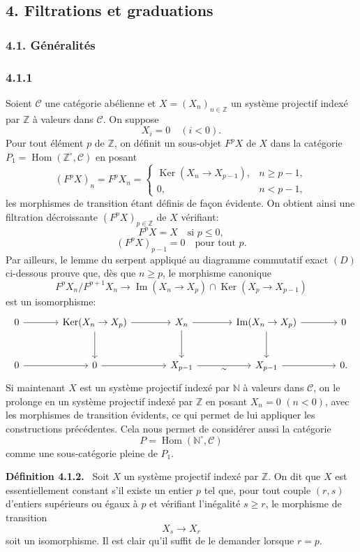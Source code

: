 \documentclass[11pt]{article}
\providecommand{\ZZ}{\mathbb{Z}}
\providecommand{\NN}{\mathbb{N}}
\newenvironment{statement}[1]{\par\medskip\noindent\textbf{#1.}\ }{\par\medskip}
\DeclareMathOperator{\Hom}{Hom}
\providecommand{\Ker}{\operatorname{Ker}}
\providecommand{\Hom}{\operatorname{Hom}}
\providecommand{\NN}{\mathbb N}
\providecommand{\cC}{\mathcal C}
\providecommand{\Im}{\operatorname{Im}}
\providecommand{\Ker}{\operatorname{Ker}}
\renewcommand{\Im}{\operatorname{Im}}
\providecommand{\Ker}{\operatorname{Ker}}
\providecommand{\Im}{\operatorname{Im}}
\providecommand{\cC}{\mathcal C}
\providecommand{\Hom}{\operatorname{Hom}}
\begin{document}
\subsection*{4. Filtrations et graduations}
\subsubsection*{4.1. Généralités}
\subsubsection*{4.1.1}
Soient $\cC$ une catégorie abélienne et $X=(X_n)_{n\in\ZZ}$ un système projectif indexé par $\ZZ$ à valeurs dans $\cC$. On suppose
\[
X_i=0\quad(i<0).
\]
Pour tout élément $p$ de $\ZZ$, on définit un sous-objet $F^pX$ de $X$ dans la catégorie $P_1=\Hom(\ZZ^\circ,\cC)$ en posant
\[
(F^pX)_n=F^pX_n=
\begin{cases}
\Ker(X_n\to X_{p-1}),& n\ge p-1,\\
0,& n<p-1,
\end{cases}
\]
les morphismes de transition étant définis de façon évidente. On obtient ainsi une filtration décroissante $(F^pX)_{p\in\ZZ}$ de $X$ vérifiant:
\begin{equation}\tag{a}
F^pX=X\quad\text{si }p\le0,
\end{equation}
\begin{equation}\tag{b}
(F^pX)_{p-1}=0\quad\text{pour tout }p.
\end{equation}
Par ailleurs, le lemme du serpent appliqué au diagramme commutatif exact $(D)$ ci-dessous prouve que, dès que $n\ge p$, le morphisme canonique
\[
F^pX_n/F^{p+1}X_n\longrightarrow \Im(X_n\to X_p)\cap\Ker(X_p\to X_{p-1})
\]
est un isomorphisme:
\[
\begin{tikzcd}[column sep=large,row sep=large]
0 \arrow[r] & \Ker(X_n\to X_p) \arrow[r] \arrow[d] & X_n \arrow[r] \arrow[d] & \Im(X_n\to X_p) \arrow[r] \arrow[d] & 0\\
0 \arrow[r] & 0 \arrow[r] & X_{p-1} \arrow[r,"\sim"'] & X_{p-1} \arrow[r] & 0 .
\end{tikzcd}
\]
Si maintenant $X$ est un système projectif indexé par $\NN$ à valeurs dans $\cC$, on le prolonge en un système projectif indexé par $\ZZ$ en posant $X_n=0$ $(n<0)$, avec les morphismes de transition évidents, ce qui permet de lui appliquer les constructions précédentes. Cela nous permet de considérer aussi la catégorie
\[
P=\Hom(\NN^\circ,\cC)
\]
comme une sous-catégorie pleine de $P_1$.

\begin{statement}{Définition 4.1.2}
Soit $X$ un système projectif indexé par $\ZZ$. On dit que $X$ est essentiellement constant s'il existe un entier $p$ tel que, pour tout couple $(r,s)$ d'entiers supérieurs ou égaux à $p$ et vérifiant l'inégalité $s\ge r$, le morphisme de transition
\[
X_s\longrightarrow X_r
\]
soit un isomorphisme. Il est clair qu'il suffit de le demander lorsque $r=p$.
\end{statement}
\end{document}
